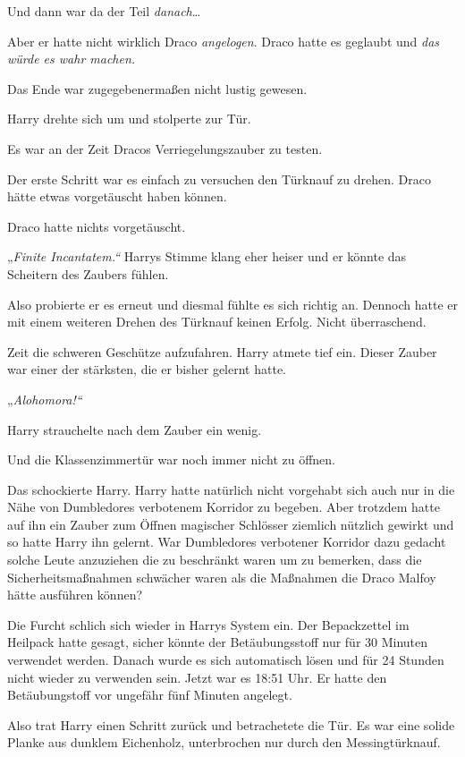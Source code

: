 {Und dann war da der Teil \emph{danach}…

Aber er hatte nicht wirklich Draco \emph{angelogen}. Draco hatte es geglaubt und \emph{das würde es wahr machen.}

Das Ende war zugegebenermaßen nicht lustig gewesen.

Harry drehte sich um und stolperte zur Tür.

Es war an der Zeit Dracos Verriegelungszauber zu testen.

Der erste Schritt war es einfach zu versuchen den Türknauf zu drehen. Draco hätte etwas vorgetäuscht haben können.

Draco hatte nichts vorgetäuscht.

„\emph{Finite Incantatem.“} Harrys Stimme klang eher heiser und er könnte das Scheitern des Zaubers fühlen.

Also probierte er es erneut und diesmal fühlte es sich richtig an. Dennoch hatte er mit einem weiteren Drehen des Türknauf keinen Erfolg. Nicht überraschend.

Zeit die schweren Geschütze aufzufahren. Harry atmete tief ein. Dieser Zauber war einer der stärksten, die er bisher gelernt hatte.

„\emph{Alohomora!“}

Harry strauchelte nach dem Zauber ein wenig.

Und die Klassenzimmertür war noch immer nicht zu öffnen.

Das schockierte Harry. Harry hatte natürlich nicht vorgehabt sich auch nur in die Nähe von Dumbledores verbotenem Korridor zu begeben. Aber trotzdem hatte auf ihn ein Zauber zum Öffnen magischer Schlösser ziemlich nützlich gewirkt und so hatte Harry ihn gelernt. War Dumbledores verbotener Korridor dazu gedacht solche Leute anzuziehen die zu beschränkt waren um zu bemerken, dass die Sicherheitsmaßnahmen schwächer waren als die Maßnahmen die Draco Malfoy hätte ausführen können?

Die Furcht schlich sich wieder in Harrys System ein. Der Bepackzettel im Heilpack hatte gesagt, sicher könnte der Betäubungsstoff nur für 30 Minuten verwendet werden. Danach wurde es sich automatisch lösen und für 24 Stunden nicht wieder zu verwenden sein. Jetzt war es 18:51 Uhr. Er hatte den Betäubungstoff vor ungefähr fünf Minuten angelegt.

Also trat Harry einen Schritt zurück und betrachetete die Tür. Es war eine solide Planke aus dunklem Eichenholz, unterbrochen nur durch den Messingtürknauf.

}

